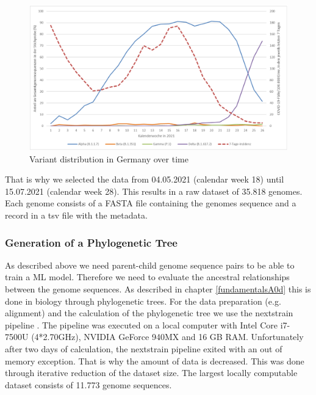 \begin{figure}[ht]
	\centering
	\includegraphics[width=1.0\linewidth]{figures/rkiVariantDistribution.png}
	\caption{Variant distribution in Germany over time \cite{robertkochinstituteditorBerichtVirusvariantenSARSCoV22021}}
	\label{rkiVariantDistribution}
\end{figure}

That is why we selected the data from 04.05.2021 (calendar week 18) until 15.07.2021 (calendar week 28). This results in a raw dataset of 35.818 genomes.
Each genome consists of a FASTA file containing the genomes sequence and a record in a tsv file with the metadata.



\subsubsection{Generation of a Phylogenetic Tree} \label{approachAb}

As described above we need parent-child genome sequence pairs to be able to train a \ac{ML} model. Therefore we need to evaluate the ancestral relationships between the genome sequences.
As described in chapter \ref{fundamentalsA0d} this is done in biology through phylogenetic trees.
For the data preparation (e.g. alignment) and the calculation of the phylogenetic tree we use the nextstrain pipeline \cite{10.1093/bioinformatics/bty407}.
The pipeline was executed on a local computer with Intel Core i7-7500U (4*2.70GHz), NVIDIA GeForce 940MX and 16 GB RAM.
Unfortunately after two days of calculation, the nextstrain pipeline exited with an out of memory exception. That is why the amount of data is decreased. This was done through iterative reduction of the dataset size. The largest locally computable dataset consists of 11.773 genome sequences.

